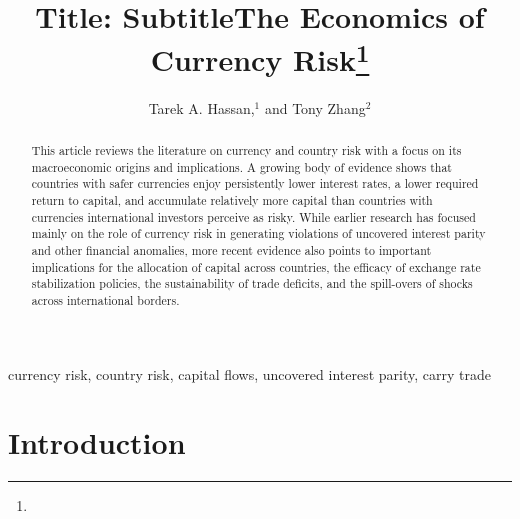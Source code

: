 \documentclass{ar-1col}
\begin{document}

\title{Title: Subtitle}


\author{Tarek A. Hassan,$^1$ and Tony Zhang$^2$  }



\title{The Economics of Currency Risk\thanks{}}



\begin{abstract}
  This article reviews the literature on currency and country risk with a focus on its macroeconomic origins and implications. A growing body of evidence shows that countries with safer currencies enjoy persistently lower interest rates, a lower required return to capital, and accumulate relatively more capital than countries with currencies international investors perceive as risky. While earlier research has focused mainly on the role of currency risk in generating violations of uncovered interest parity and other financial anomalies, more recent evidence also points to important implications for the allocation of capital across countries, the efficacy of exchange rate stabilization policies, the sustainability of trade deficits, and the spill-overs of shocks across international borders.
\end{abstract}


\begin{keywords}
  currency risk, country risk, capital flows, uncovered interest parity, carry trade
\end{keywords}
\maketitle


\section{Introduction}
\end{document}

